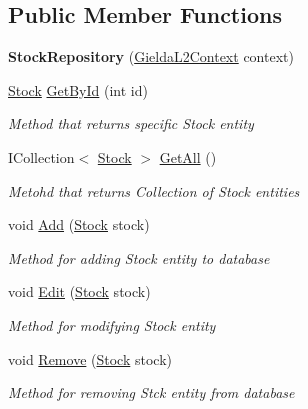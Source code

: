 \subsection*{Public Member Functions}
\begin{DoxyCompactItemize}
\item 
\mbox{\label{class_gielda_l2_1_1_i_n_f_r_a_s_t_r_u_c_t_u_r_e_1_1_repositories_1_1_stock_repository_a5d2720b31c0c887589c00281150d3741}} 
{\bfseries Stock\+Repository} (\mbox{\hyperlink{class_gielda_l2_1_1_d_b_1_1_gielda_l2_context}{Gielda\+L2\+Context}} context)
\item 
\mbox{\hyperlink{class_gielda_l2_1_1_d_b_1_1_entities_1_1_stock}{Stock}} \mbox{\hyperlink{class_gielda_l2_1_1_i_n_f_r_a_s_t_r_u_c_t_u_r_e_1_1_repositories_1_1_stock_repository_ab4ff737a226f62c0abbe80751029bbdf}{Get\+By\+Id}} (int id)
\begin{DoxyCompactList}\small\item\em Method that returns specific Stock entity \end{DoxyCompactList}\item 
I\+Collection$<$ \mbox{\hyperlink{class_gielda_l2_1_1_d_b_1_1_entities_1_1_stock}{Stock}} $>$ \mbox{\hyperlink{class_gielda_l2_1_1_i_n_f_r_a_s_t_r_u_c_t_u_r_e_1_1_repositories_1_1_stock_repository_a444dab153a9efe503ab774da96cfa4e7}{Get\+All}} ()
\begin{DoxyCompactList}\small\item\em Metohd that returns Collection of Stock entities \end{DoxyCompactList}\item 
void \mbox{\hyperlink{class_gielda_l2_1_1_i_n_f_r_a_s_t_r_u_c_t_u_r_e_1_1_repositories_1_1_stock_repository_a156b8b54cd523f36d5a5e82a0d7532ec}{Add}} (\mbox{\hyperlink{class_gielda_l2_1_1_d_b_1_1_entities_1_1_stock}{Stock}} stock)
\begin{DoxyCompactList}\small\item\em Method for adding Stock entity to database \end{DoxyCompactList}\item 
void \mbox{\hyperlink{class_gielda_l2_1_1_i_n_f_r_a_s_t_r_u_c_t_u_r_e_1_1_repositories_1_1_stock_repository_aaf7203a96523df7f04c2a0a8fde5b1fe}{Edit}} (\mbox{\hyperlink{class_gielda_l2_1_1_d_b_1_1_entities_1_1_stock}{Stock}} stock)
\begin{DoxyCompactList}\small\item\em Method for modifying Stock entity \end{DoxyCompactList}\item 
void \mbox{\hyperlink{class_gielda_l2_1_1_i_n_f_r_a_s_t_r_u_c_t_u_r_e_1_1_repositories_1_1_stock_repository_a939060d75ec4eda1c1d8a0f8824a088f}{Remove}} (\mbox{\hyperlink{class_gielda_l2_1_1_d_b_1_1_entities_1_1_stock}{Stock}} stock)
\begin{DoxyCompactList}\small\item\em Method for removing Stck entity from database \end{DoxyCompactList}\end{DoxyCompactItemize}
